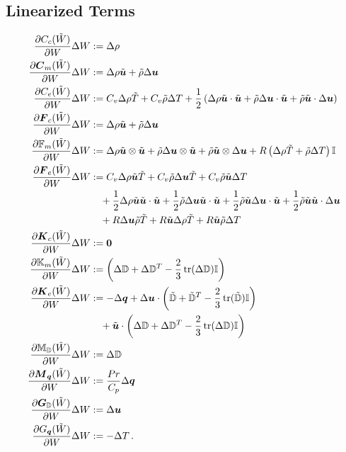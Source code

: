 \documentclass[Dissertation.tex]{subfiles}
\begin{document}
\subsection{Linearized Terms}
\begin{align*}
\frac{\partial C_c(\tilde W)}{\partial W}\Delta W&:=
	\Delta\rho
	\\
\frac{\partial\boldsymbol C_m(\tilde W)}{\partial W}\Delta W&:=
	\Delta\rho\tilde{\boldsymbol u}+\tilde\rho\Delta\boldsymbol u
	\\
\frac{\partial C_e(\tilde W)}{\partial W}\Delta W&:=
	C_v\Delta\rho\tilde T+C_v\tilde\rho\Delta T
	+\frac{1}{2}\left( \Delta\rho\tilde{\boldsymbol u}\cdot\tilde{\boldsymbol u}+\tilde\rho\Delta\boldsymbol u\cdot\tilde{\boldsymbol u}+\tilde\rho\tilde{\boldsymbol u}\cdot\Delta\boldsymbol u \right)
	\\
\frac{\partial\boldsymbol F_c(\tilde W)}{\partial W}\Delta W&:=
	\Delta\rho\tilde{\boldsymbol u}+\tilde\rho\Delta\boldsymbol u
	\\
\frac{\partial\mathbb{F}_m(\tilde W)}{\partial W}\Delta W&:=
	\Delta\rho\tilde{\boldsymbol u}\otimes\tilde{\boldsymbol u}
	+\tilde\rho\Delta\boldsymbol u\otimes\tilde{\boldsymbol u}
	+\tilde\rho\tilde{\boldsymbol u}\otimes\Delta\boldsymbol u
	+R\left( \Delta\rho\tilde T+\tilde\rho\Delta T \right)\mathbb{I}
	\\
\frac{\partial\boldsymbol F_e(\tilde W)}{\partial W}\Delta W&:=
	C_v\Delta\rho\tilde{\boldsymbol u}\tilde T+C_v\tilde\rho\Delta\boldsymbol u\tilde T+C_v\tilde\rho\tilde{\boldsymbol u}\Delta T
	\\&\quad
	+\frac{1}{2}\Delta\rho\tilde{\boldsymbol u}\tilde{\boldsymbol u}\cdot\tilde{\boldsymbol u}
	+\frac{1}{2}\tilde\rho\Delta\boldsymbol u\tilde{\boldsymbol u}\cdot\tilde{\boldsymbol u}
	+\frac{1}{2}\tilde\rho\tilde{\boldsymbol u}\Delta\boldsymbol u\cdot\tilde{\boldsymbol u}
	+\frac{1}{2}\tilde\rho\tilde{\boldsymbol u}\tilde{\boldsymbol u}\cdot\Delta\boldsymbol u
	\\&\quad
	+R\Delta\boldsymbol u\tilde\rho\tilde T
	+R\tilde{\boldsymbol u}\Delta\rho\tilde T
	+R\tilde{\boldsymbol u}\tilde\rho\Delta T
	\\
\frac{\partial\boldsymbol K_c(\tilde W)}{\partial W}\Delta W&:=
	\boldsymbol 0\\
\frac{\partial\mathbb{K}_m(\tilde W)}{\partial W}\Delta W&:=
	\left( \Delta\mathbb{D}+\Delta\mathbb{D}^T-\frac{2}{3}\operatorname*{tr}(\Delta\mathbb{D})\mathbb{I} \right)
	\\
\frac{\partial\boldsymbol K_e(\tilde W)}{\partial W}\Delta W&:=
	-\Delta\boldsymbol q+\Delta\boldsymbol u\cdot\left( \tilde{\mathbb{D}}+\tilde{\mathbb{D}}^T-\frac{2}{3}\operatorname*{tr}(\tilde{\mathbb{D}})\mathbb{I} \right)
	\\&\quad
	+\tilde{\boldsymbol u}\cdot\left( \Delta\mathbb{D}+\Delta\mathbb{D}^T-\frac{2}{3}\operatorname*{tr}(\Delta\mathbb{D})\mathbb{I} \right)\\
\frac{\partial\mathbb{M}_{\mathbb{D}}(\tilde W)}{\partial W}\Delta W&:=
	\Delta\mathbb{D}
	\\
\frac{\partial\boldsymbol M_{\boldsymbol q}(\tilde W)}{\partial W}\Delta W&:=
	\frac{Pr}{C_p}\Delta\boldsymbol q
	\\
\frac{\partial\boldsymbol G_{\mathbb{D}}(\tilde W)}{\partial W}\Delta W&:=
	\Delta\boldsymbol u
	\\
\frac{\partial G_{\boldsymbol q}(\tilde W)}{\partial W}\Delta W&:=
	-\Delta T
	\,.
\end{align*}
\end{document}

